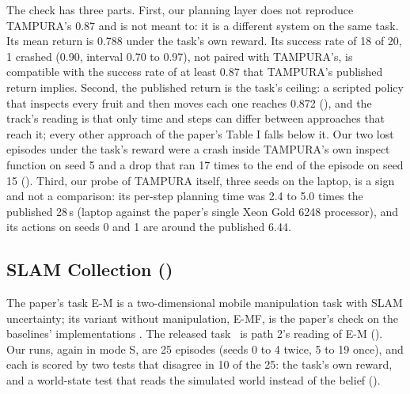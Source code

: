 The check has three parts. First, our planning layer does not reproduce
TAMPURA's 0.87 and is not meant to: it is a different system on the same task. Its
mean return is 0.788 under the task's own reward. Its success rate of 18 of 20, 1
crashed (0.90, interval 0.70 to 0.97), not paired with TAMPURA's, is compatible with the success rate of at least 0.87
that TAMPURA's published return implies. Second, the published return is the
task's ceiling: a scripted policy that inspects every fruit and then moves each
one reaches 0.872 (), and the track's reading is that only time and steps can
differ between approaches that reach it; every other approach of the paper's
Table I falls below it. Our two lost episodes under the task's reward were a crash
inside TAMPURA's own inspect function on seed 5 and a drop that ran 17 times to the
end of the episode on seed 15 (). Third, our probe of TAMPURA itself, three
seeds on the laptop, is a sign and not a comparison: its per-step planning time
was 2.4 to 5.0 times the published 28\,s (laptop against the paper's single Xeon
Gold 6248 processor), and its actions on seeds 0 and 1 are around the published
6.44.

\subsection{SLAM Collection (\slamcol)}

The paper's task E-M is a two-dimensional mobile manipulation task with SLAM
uncertainty; its variant without manipulation, E-MF, is the paper's check on the
baselines' implementations \cite{curtis2024partially}. The released task
\slamcol\ is path 2's reading of E-M (). Our runs, again in mode S, are 25
episodes (seeds 0 to 4 twice, 5 to 19 once), and each is scored by two tests that
disagree in 10 of the 25: the task's own reward, and a world-state test that reads
the simulated world instead of the belief ().

